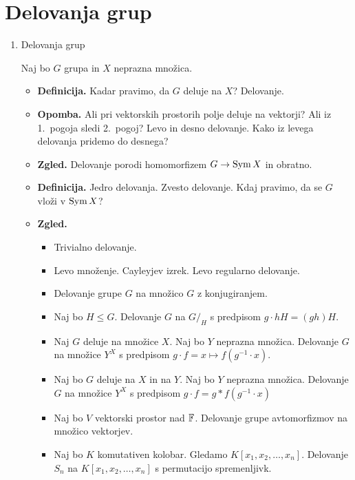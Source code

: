 \section{Delovanja grup}
\begin{enumerate}
    \item Delovanja grup
    
    Naj bo \(G\) grupa in \(X\) neprazna množica.
    \begin{itemize}
        \item \textbf{Definicija.} Kadar pravimo, da \(G\) deluje na \(X\)? Delovanje.
        \item \textbf{Opomba.} Ali pri vektorskih prostorih polje deluje na vektorji? Ali iz 1.\ pogoja sledi 2.\ pogoj? Levo in desno delovanje. Kako iz levega delovanja pridemo do desnega?
        \item \textbf{Zgled.} Delovanje porodi homomorfizem \(G \to \operatorname{Sym} X\) in obratno.
        \item \textbf{Definicija.} Jedro delovanja. Zvesto delovanje. Kdaj pravimo, da se \(G\) vloži v \(\operatorname{Sym} X\)?
        \item \textbf{Zgled.} \
        \begin{itemize}
            \item Trivialno delovanje.
            \item Levo množenje. Cayleyjev izrek. Levo regularno delovanje.
            \item Delovanje grupe \(G\) na množico \(G\) z konjugiranjem.
            \item Naj bo \(H \leq G\). Delovanje \(G\) na \(G/_H\) s predpisom \(g \cdot hH = (gh)H\).
            \item Naj \(G\) deluje na množice \(X\). Naj bo \(Y\) neprazna množica. Delovanje \(G\) na množice \(Y^X\) s predpisom \(g \cdot f = x \mapsto f(g^{-1} \cdot x)\).
            \item Naj bo \(G\) deluje na \(X\) in na \(Y\). Naj bo \(Y\) neprazna množica. Delovanje \(G\) na množice \(Y^X\) s predpisom \(g \cdot f = g * f(g^{-1} \cdot x)\)
            \item Naj bo \(V\) vektorski prostor nad \(\mathbb{F}\). Delovanje grupe avtomorfizmov na množico vektorjev. 
            \item Naj bo \(K\) komutativen kolobar. Gledamo \(K[x_1, x_2, \ldots, x_n]\). Delovanje \(S_n\) na \(K[x_1, x_2, \ldots, x_n]\) s permutacijo spremenljivk.
        \end{itemize}        
    \end{itemize}


\end{enumerate}
